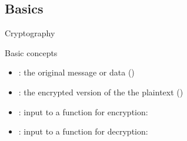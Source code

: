 \subsection{Basics}
\begin{slide}{Cryptography}
  \begin{centerfig}
  \end{centerfig}
  
  \begin{block}{Basic concepts}
    \begin{itemize}
    \item {}: the original message or data ()
    \item {}: the encrypted version of the the plaintext ()
    \item {}: input  to a function for encryption: 
    \item {}: input  to a function for decryption: 
    \end{itemize}
  \end{block}
\end{slide}

